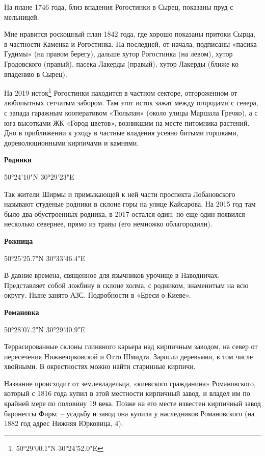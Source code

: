 На плане 1746 года, близ впадения Рогостинки в Сырец, показаны пруд с мельницей.

Мне нравится роскошный план 1842 года, где хорошо показаны притоки Сырца, в частности Каменка и Рогостинка. На последней, от начала, подписаны «пасика Гудимы» (на правом берегу), дальше хутор Рогостинка (на левом), хутор Гродовского (правый), пасека Лакерды (правый), хутор Лакерды (ближе ко впадению в Сырец).

На 2019 исток\footnote{50°29'00.1"N 30°24'52.0"E} Рогостинки находится в частном секторе, отгороженном от любопытных сетчатым забором. Там этот исток зажат между огородами с севера, с запада гаражным кооперативом «Тюльпан» (около улицы Маршала Гречко), а с юга высотками ЖК «Город цветов», возникшим на месте питомника растений. Дно в приближении к уходу в частные владения усеяно битыми горшками, дореволюционными кирпичами и камнями.\\ 

\medskip

\textbf{Родники}

50°24'10"N 30°29'23"E

Так жители Ширмы и примыкающей к ней части проспекта Лобановского называют студеные родники в склоне горы на улице Кайсарова. На 2015 год там было два обустроенных родника, в 2017 остался один, но еще один появился несколько севернее, прямо из травы (его немножко облагородили).\\

\medskip

\textbf{Рожница} 

50°25'25.7"N 30°33'46.4"E

В давние времена, священное для язычников урочище в Наводничах. Представляет собой ложбину в склоне холма, с родником, знаменитым на всю округу. Ныне занято АЗС. Подробности в «Ереси о Киеве».\\

\medskip

\textbf{Романовка} 

50°28'07.2"N 30°29'40.9"E

Террасированные склоны глиняного карьера над кирпичным заводом, на север от пересечения Нижнеюрковской и Отто Шмидта. Заросли деревьями, в том числе хвойными. В окрестностях можно найти старинные кирпичи.

Название происходит от землевладельца, «киевского гражданина» Романовского, который с 1816 года купил в этой местности кирпичный завод, и владел им по крайней мере по половину 19 века. Позже на его месте известен кирпичный завод баронессы Фиркс – усадьбу и завод она купила у наследников Романовского (на 1882 год адрес Нижняя Юрковица, 4).

